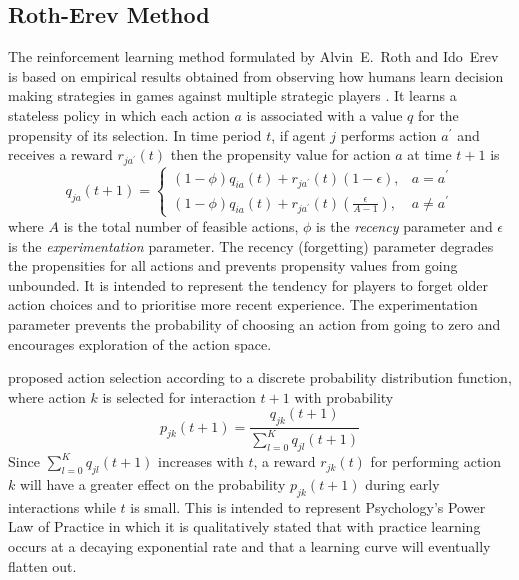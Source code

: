 \subsection{Roth-Erev Method}
\label{sec:rotherev}
The reinforcement learning method formulated by Alvin~E.~Roth and Ido~Erev is
based on empirical results obtained from observing how humans learn decision
making strategies in games against multiple strategic players
\cite{roth:games,roth:aer}.  It learns a stateless policy in which each action
$a$ is associated with a value $q$ for the propensity of its selection.  In
time period $t$, if agent $j$ performs action $a^\prime$ and receives a reward
$r_{ja^\prime}(t)$ then the propensity value for action $a$ at time $t+1$ is
\begin{equation}
\label{eq:rotherev}
q_{ja}(t+1) =
\begin{cases}
(1-\phi)q_{ia}(t) + r_{ja^\prime}(t)(1-\epsilon), & \text{$a = a^\prime$} \\
(1-\phi)q_{ia}(t) + r_{ja^\prime}(t)(\frac{\epsilon}{A-1}), & \text{$a \ne
a^\prime$}
\end{cases}
\end{equation}
where $A$ is the total number of feasible actions, $\phi$ is the
\textit{recency} parameter and $\epsilon$ is the \textit{experimentation} parameter.  The recency (forgetting) parameter
degrades the propensities for all actions and prevents propensity values from
going unbounded.  It is intended to represent the tendency for players to forget
older action choices and to prioritise more recent experience.  The
experimentation parameter prevents the probability of choosing an action from
going to zero and encourages exploration of the action space.

 proposed action selection according to a
discrete probability distribution function, where action $k$ is selected for interaction $t+1$ with
probability
\begin{equation}
\label{eq:re_prob}
p_{jk}(t+1) = \frac{q_{jk}(t+1)}{\sum_{l=0}^K q_{jl}(t+1)}
\end{equation}
Since $\sum_{l=0}^K q_{jl}(t+1)$ increases with $t$, a reward $r_{jk}(t)$ for
performing action $k$ will have a greater effect on the probability
$p_{jk}(t+1)$ during early interactions while $t$ is small.  This is intended
to represent Psychology's Power Law of Practice in which it is qualitatively
stated that with practice learning occurs at a decaying exponential rate and
that a learning curve will eventually flatten out.

